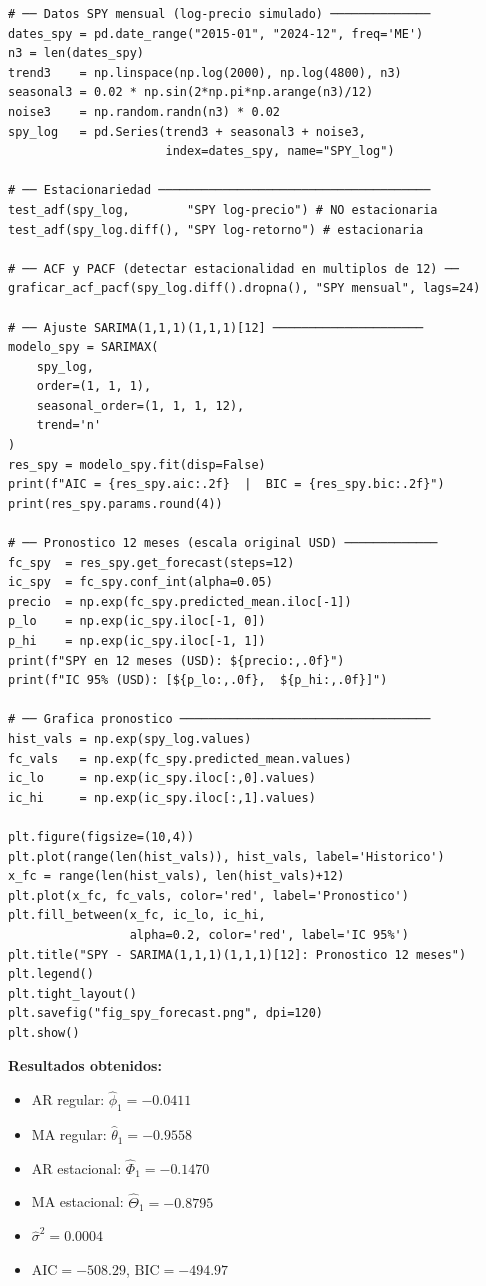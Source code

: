 \documentclass[12pt,a4paper]{article}
\begin{document}
\begin{lstlisting}[caption={Ejemplo 3 --- SARIMA$(1,1,1)(1,1,1)_{12}$ para SPY mensual}]
# ── Datos SPY mensual (log-precio simulado) ──────────────
dates_spy = pd.date_range("2015-01", "2024-12", freq='ME')
n3 = len(dates_spy)
trend3    = np.linspace(np.log(2000), np.log(4800), n3)
seasonal3 = 0.02 * np.sin(2*np.pi*np.arange(n3)/12)
noise3    = np.random.randn(n3) * 0.02
spy_log   = pd.Series(trend3 + seasonal3 + noise3,
                      index=dates_spy, name="SPY_log")

# ── Estacionariedad ──────────────────────────────────────
test_adf(spy_log,        "SPY log-precio") # NO estacionaria
test_adf(spy_log.diff(), "SPY log-retorno") # estacionaria

# ── ACF y PACF (detectar estacionalidad en multiplos de 12) ──
graficar_acf_pacf(spy_log.diff().dropna(), "SPY mensual", lags=24)

# ── Ajuste SARIMA(1,1,1)(1,1,1)[12] ─────────────────────
modelo_spy = SARIMAX(
    spy_log,
    order=(1, 1, 1),
    seasonal_order=(1, 1, 1, 12),
    trend='n'
)
res_spy = modelo_spy.fit(disp=False)
print(f"AIC = {res_spy.aic:.2f}  |  BIC = {res_spy.bic:.2f}")
print(res_spy.params.round(4))

# ── Pronostico 12 meses (escala original USD) ─────────────
fc_spy  = res_spy.get_forecast(steps=12)
ic_spy  = fc_spy.conf_int(alpha=0.05)
precio  = np.exp(fc_spy.predicted_mean.iloc[-1])
p_lo    = np.exp(ic_spy.iloc[-1, 0])
p_hi    = np.exp(ic_spy.iloc[-1, 1])
print(f"SPY en 12 meses (USD): ${precio:,.0f}")
print(f"IC 95% (USD): [${p_lo:,.0f},  ${p_hi:,.0f}]")

# ── Grafica pronostico ───────────────────────────────────
hist_vals = np.exp(spy_log.values)
fc_vals   = np.exp(fc_spy.predicted_mean.values)
ic_lo     = np.exp(ic_spy.iloc[:,0].values)
ic_hi     = np.exp(ic_spy.iloc[:,1].values)

plt.figure(figsize=(10,4))
plt.plot(range(len(hist_vals)), hist_vals, label='Historico')
x_fc = range(len(hist_vals), len(hist_vals)+12)
plt.plot(x_fc, fc_vals, color='red', label='Pronostico')
plt.fill_between(x_fc, ic_lo, ic_hi,
                 alpha=0.2, color='red', label='IC 95%')
plt.title("SPY - SARIMA(1,1,1)(1,1,1)[12]: Pronostico 12 meses")
plt.legend()
plt.tight_layout()
plt.savefig("fig_spy_forecast.png", dpi=120)
plt.show()
\end{lstlisting}

\textbf{Resultados obtenidos:}
\begin{itemize}
  \item AR regular:     $\hat{\phi}_1   = -0.0411$
  \item MA regular:     $\hat{\theta}_1 = -0.9558$
  \item AR estacional:  $\hat{\Phi}_1   = -0.1470$
  \item MA estacional:  $\hat{\Theta}_1 = -0.8795$
  \item $\hat{\sigma}^2 = 0.0004$
  \item $\mathrm{AIC} = -508.29$, \quad $\mathrm{BIC} = -494.97$
\end{itemize}
\end{document}
